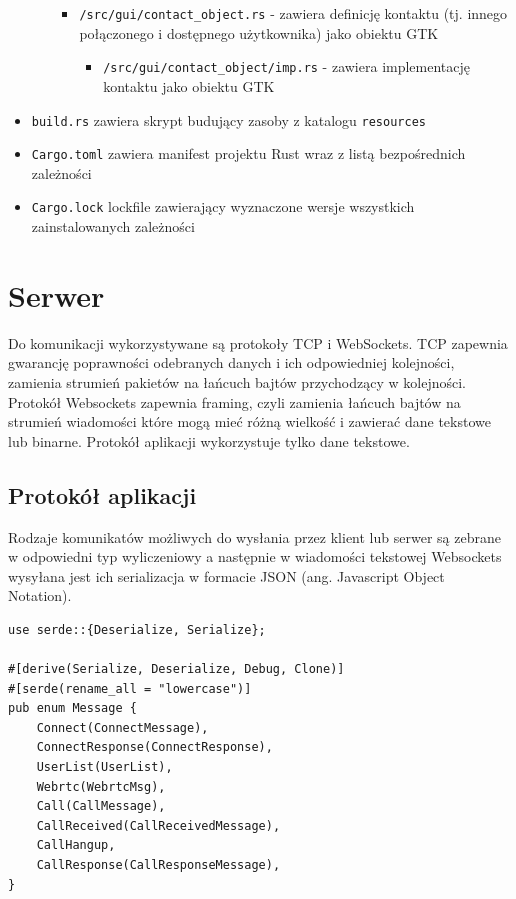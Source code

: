 \begin{itemize}
\begin{itemize}
\begin{itemize}
                        \item \verb|/src/gui/contact_object.rs| - zawiera definicję kontaktu (tj. innego
                              połączonego i dostępnego użytkownika) jako obiektu GTK
                              \begin{itemize}
                                  \item \verb|/src/gui/contact_object/imp.rs| - zawiera implementację kontaktu
                                        jako obiektu GTK
                              \end{itemize}
                    \end{itemize}
          \end{itemize}

    \item \verb|build.rs| zawiera skrypt budujący zasoby z katalogu \verb|resources|
    \item \verb|Cargo.toml| zawiera manifest projektu Rust wraz z listą bezpośrednich
          zależności
    \item \verb|Cargo.lock| lockfile zawierający wyznaczone wersje wszystkich zainstalowanych
          zależności
\end{itemize}

\section{Serwer}

Do komunikacji wykorzystywane są protokoły TCP i WebSockets. TCP zapewnia gwarancję poprawności
odebranych danych i ich odpowiedniej kolejności, zamienia strumień pakietów na łańcuch bajtów
przychodzący w kolejności. Protokół Websockets zapewnia framing, czyli zamienia łańcuch bajtów na
strumień wiadomości które mogą mieć różną wielkość i zawierać dane tekstowe lub binarne. Protokół
aplikacji wykorzystuje tylko dane tekstowe.

\subsection{Protokół aplikacji}

Rodzaje komunikatów możliwych do wysłania przez klient lub serwer są zebrane w odpowiedni typ
wyliczeniowy a następnie w wiadomości tekstowej Websockets wysyłana jest ich serializacja w formacie
JSON (ang. Javascript Object Notation).

\begin{verbatim}
use serde::{Deserialize, Serialize};

#[derive(Serialize, Deserialize, Debug, Clone)]
#[serde(rename_all = "lowercase")]
pub enum Message {
    Connect(ConnectMessage),
    ConnectResponse(ConnectResponse),
    UserList(UserList),
    Webrtc(WebrtcMsg),
    Call(CallMessage),
    CallReceived(CallReceivedMessage),
    CallHangup,
    CallResponse(CallResponseMessage),
}
\end{verbatim}

